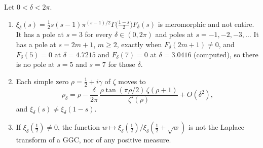 \begin{proposition}[Obstructions]\label{cg:prop:obstructions}
Let $0<\delta<2\pi$.
\begin{enumerate}
\item[(a)] $\xi_\delta(s)=\frac12s(s-1)\pi^{(s-1)/2}\Gamma\bigl(\tfrac{1-s}2\bigr)F_\delta(s)$ is meromorphic and not entire. It has a pole at $s=3$ for every $\delta\in(0,2\pi)$ and poles at $s=-1,-2,-3,\dots$ It has a pole at $s=2m+1$, $m\ge2$, exactly when $F_\delta(2m+1)\ne0$, and $F_\delta(5)=0$ at $\delta=4.7215$ and $F_\delta(7)=0$ at $\delta=3.0416$ (computed), so there is no pole at $s=5$ and $s=7$ for those $\delta$.
\item[(b)] Each simple zero $\rho=\frac12+i\gamma$ of $\zeta$ moves to
\begin{equation}\label{cg:eq:drift}
\rho_\delta=\rho-\frac{\delta}{2\pi}\,\frac{\rho\tan(\pi\rho/2)\,\zeta(\rho+1)}{\zeta'(\rho)}+O(\delta^2),
\end{equation}
and $\xi_\delta(s)\ne\xi_\delta(1-s)$.
\item[(c)] If $\xi_\delta(\frac12)\neq0$, the function $w\mapsto\xi_\delta(\frac12)/\xi_\delta(\frac12+\sqrt w)$ is not the Laplace transform of a GGC, nor of any positive measure.
\end{enumerate}
\end{proposition}

